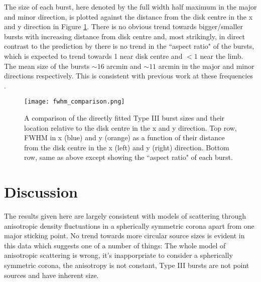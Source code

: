 The size of each burst, here denoted by the full width half maximum in the major and minor direction, is plotted against the distance from the disk centre in the x and y direction in Figure \ref{fig:fwhm_comp}. There is no obvious trend towards bigger/smaller bursts with increasing distance from disk centre and, most strikingly, in direct contrast to the prediction by \cite{Kontar2019} there is no trend in the ``aspect ratio" of the bursts, which is expected to trend towards 1 near disk centre and $< 1$ near the limb. The mean size of the bursts $\sim 16$ arcmin and $\sim 11$ arcmin in the major and minor directions respectively. This is consistent with previous work at these frequencies \citep{Kontar2017, Murphy2021}.

\begin{figure}
\centering
\texttt{[image: fwhm\_comparison.png]}
\caption[Directly fitted Type III burst sizes as a function of position relative to disk centre.]{A comparison of the directly fitted Type III burst sizes and their location relative to the disk centre in the x and y direction. Top row, FWHM in x (blue) and y (orange) as a function of their distance from the disk centre in the x (left) and y (right) direction. Bottom row, same as above except showing the ``aspect ratio" of each burst.}
\label{fig:fwhm_comp}
\end{figure}

\section{Discussion}
\label{sec:obsvtheory_discussion}
The results given here are largely consistent with models of scattering through anisotropic density fluctuations in a spherically symmetric corona apart from one major sticking point. No trend towards more circular source sizes is evident in this data which suggests one of a number of things: The whole model of anisotropic scattering is wrong, it's inapporpriate to consider a spherically symmetric corona, the anisotropy is not constant, Type III bursts are not point sources and have inherent size. 

